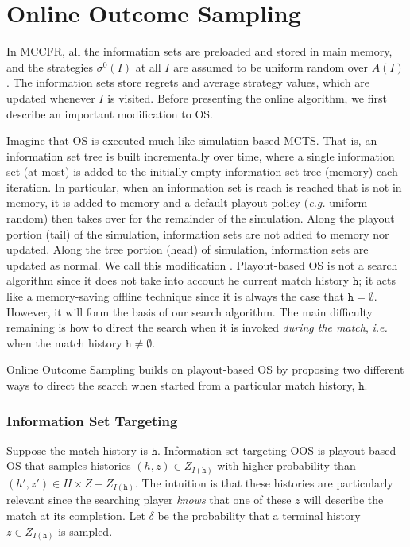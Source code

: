 \documentclass[letterpaper]{article}
\newcommand{\tth}{\mathtt{h}}
\newcommand{\defword}[1]{\textbf{\boldmath{#1}}}
\newcommand{\ie}{{\it i.e.}\xspace}
\newcommand{\eg}{{\it e.g.}\xspace}
\begin{document}
\section{Online Outcome Sampling}


In MCCFR, all the information sets are preloaded and stored in main memory, and
the strategies $\sigma^0(I)$ at all $I$ are assumed to be uniform random over $A(I)$. The information sets store regrets and average strategy 
values, which are updated whenever $I$ is visited. Before presenting the online algorithm, we first describe an important modification to OS.

Imagine that OS is executed much like simulation-based MCTS. That is, an information set tree is built incrementally over 
time, where a single information set (at most) is added to the initially empty information set tree (memory) each iteration. In 
particular, when an information set is reach is reached that is not in memory, it is added to memory and a default playout policy 
(\eg uniform random) then takes over for the remainder of the simulation. Along the playout portion (tail) of the simulation,  
information sets are not added to memory nor updated. Along the tree portion (head) of simulation, information sets are updated as normal. 
We call this modification \defword{playout-based outcome sampling}. 
Playout-based OS is not a search algorithm since it does not take into account he current match history $\tth$; 
it acts like a memory-saving offline technique since it is always the case that $\tth = \emptyset$.
However, it will form the basis of our search algorithm. 
The main difficulty remaining is how to direct the search when it is invoked {\it during the match}, 
\ie when the match history $\tth \not= \emptyset$. 

Online Outcome Sampling builds on playout-based OS by proposing two different ways to direct the search when started from a particular
match history, $\tth$. 

\subsubsection{Information Set Targeting}

Suppose the match history is $\tth$. Information set targeting OOS is playout-based OS that samples histories $(h,z) \in Z_{I(\tth)}$ 
with higher probability than $(h',z') \in H \times Z - Z_{I(\tth)}$. The intuition is that these histories are particularly 
relevant since the searching player {\it knows} that one of these $z$ will describe the match at its completion. Let $\delta$ be 
the probability that a terminal history $z \in Z_{I(\tth)}$ is sampled.
\end{document}
